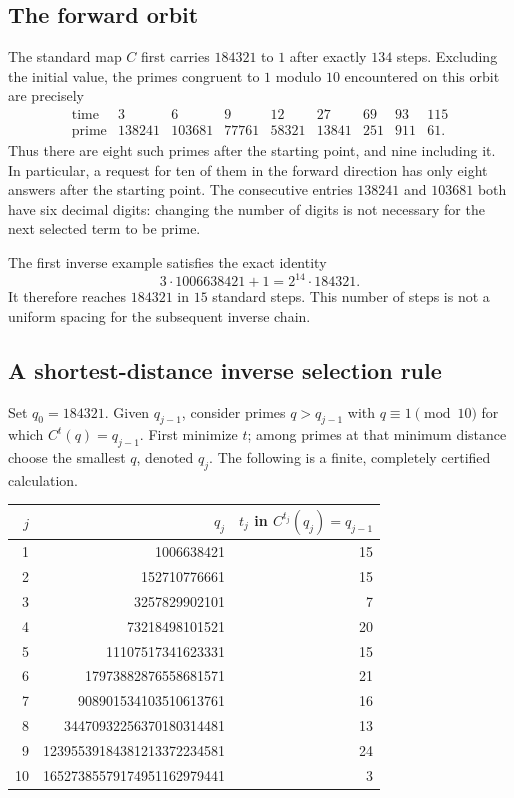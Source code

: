 \documentclass[11pt,a4paper]{article}
\theoremstyle{definition}
\theoremstyle{remark}
\numberwithin{equation}{section}
\begin{document}
\subsection{The forward orbit}
The standard map $C$ first carries $184321$ to $1$ after exactly $134$
steps. Excluding the initial value, the primes congruent to $1$ modulo $10$
encountered on this orbit are precisely
\[
\begin{array}{r|rrrrrrrr}
\text{time}&3&6&9&12&27&69&93&115\\\hline
\text{prime}&138241&103681&77761&58321&13841&251&911&61.
\end{array}
\]
Thus there are eight such primes after the starting point, and nine including
it. In particular, a request for ten of them in the forward direction has
only eight answers after the starting point. The consecutive entries
$138241$ and $103681$ both have six decimal digits: changing the number of
digits is not necessary for the next selected term to be prime.

The first inverse example satisfies the exact identity
\[
3\cdot1006638421+1=2^{14}\cdot184321.
\]
It therefore reaches $184321$ in $15$ standard steps. This number of steps
is not a uniform spacing for the subsequent inverse chain.

\subsection{A shortest-distance inverse selection rule}
Set $q_0=184321$. Given $q_{j-1}$, consider primes $q>q_{j-1}$ with
$q\equiv1\pmod {10}$ for which $C^t(q)=q_{j-1}$. First minimize $t$;
among primes at that minimum distance choose the smallest $q$, denoted
$q_j$. The following is a finite, completely certified calculation.

\begin{center}
\begin{tabular}{r r r}
\toprule
$j$ & $q_j$ & $t_j$ in $C^{t_j}(q_j)=q_{j-1}$\\\midrule
1 & 1006638421 & 15\\
2 & 152710776661 & 15\\
3 & 3257829902101 & 7\\
4 & 73218498101521 & 20\\
5 & 11107517341623331 & 15\\
6 & 17973882876558681571 & 21\\
7 & 908901534103510613761 & 16\\
8 & 34470932256370180314481 & 13\\
9 & 12395539184381213372234581 & 24\\
10 & 16527385579174951162979441 & 3\\\bottomrule
\end{tabular}
\end{center}
\end{document}

